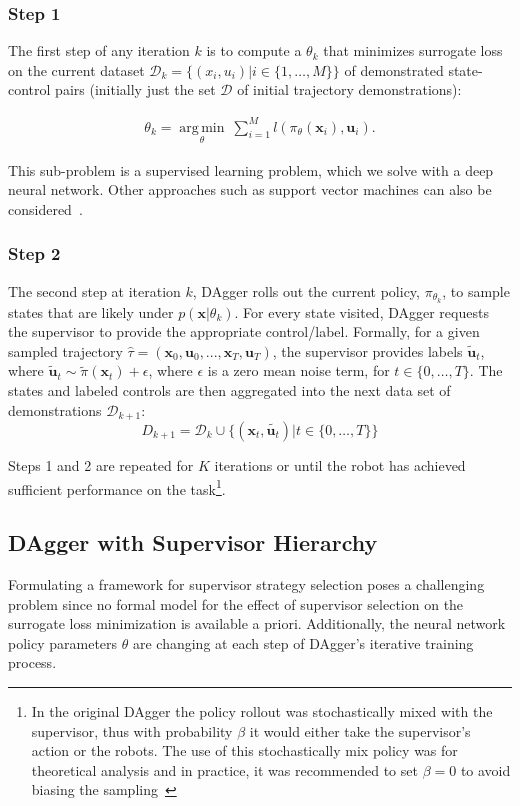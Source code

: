 \documentclass[10pt, conference]{ieeeconf}      %
\DeclareMathOperator*{\argmin}{arg\,min}
\newcommand{\bu}{\mathbf{u}}
\newcommand{\bx}{\mathbf{x}}
\begin{document}
\subsubsection{Step 1}
The first step of any iteration $k$ is to compute a $\theta_k$ that minimizes surrogate loss on the current dataset $\mathcal{D}_k=\{(x_i,u_i)|i\in\{1,\ldots,M\}\}$ of demonstrated state-control pairs (initially just the set $\mathcal{D}$ of initial trajectory demonstrations):

 \vspace{-1ex}
\begin{align}\label{eq:super_objj}
\theta_{k} = \underset{\theta}{\argmin} \: \sum_{i=1}^{M} l(\pi_{\theta}(\bx_i),\bu_i).
\end{align}

This sub-problem is a supervised learning problem, which we solve with a deep neural network. Other approaches such as
support vector machines can also be considered~\cite{scholkopf2002learning}. 
 

 \subsubsection{Step 2}
The second step at iteration $k$, DAgger rolls out the current policy, $\pi_{\theta_{k}}$, to sample states that are likely under $p(\bx|\theta_{k})$.  For every state visited, DAgger requests the supervisor to provide the appropriate control/label. Formally, for a given sampled trajectory  $\hat{\tau} = (\bx_0,\bu_0,...,\bx_T,\bu_T )$, the supervisor provides labels $\tilde{\bu}_t$, where $\tilde{\bu}_t \sim \tilde{\pi}(\bx_t) + \epsilon$, where $\epsilon$ is a  zero mean noise term, for $t\in \{0, \ldots, T\}$.
The states and labeled controls are then aggregated into the next data set of demonstrations $\mathcal{D}_{k+1}$:
$$D_{k+1}=\mathcal{D}_k \cup \{(\bx_t,\tilde{\bu_t})|t\in\{0,\ldots,T\}\} $$

Steps 1 and 2 are repeated for $K$ iterations or until the robot has achieved sufficient performance on the
task\footnote{In the original DAgger the policy rollout was stochastically mixed with the supervisor, thus with
    probability $\beta$ it would either take the supervisor's action or the robots. The use of this stochastically mix
    policy was for theoretical analysis and in practice, it was recommended to set $\beta = 0$ to avoid biasing the
sampling~\cite{NIPS2014_5421,ross2010reduction}}.


\subsection{DAgger with Supervisor Hierarchy}
Formulating a framework for supervisor strategy selection poses a challenging problem since no formal model
for the effect of supervisor selection on the surrogate loss minimization is available a priori. Additionally, the
neural network policy parameters $\theta$ are  changing at each step of DAgger's iterative training process.
\end{document}
